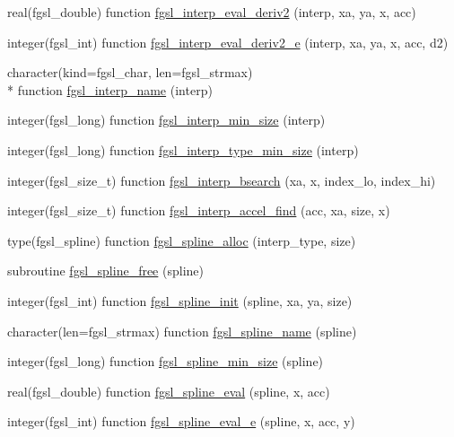 \begin{DoxyCompactItemize}
\item 
real(fgsl\-\_\-double) function \hyperlink{interp_8finc_a4b15b2342368a4046e9d18f60131a9e7}{fgsl\-\_\-interp\-\_\-eval\-\_\-deriv2} (interp, xa, ya, x, acc)
\item 
integer(fgsl\-\_\-int) function \hyperlink{interp_8finc_a5752fd272762ec6357b0f8c353c6c1a5}{fgsl\-\_\-interp\-\_\-eval\-\_\-deriv2\-\_\-e} (interp, xa, ya, x, acc, d2)
\item 
character(kind=fgsl\-\_\-char, len=fgsl\-\_\-strmax) \\*
function \hyperlink{interp_8finc_a13eac3e860747823e4eb7056cdbaaadb}{fgsl\-\_\-interp\-\_\-name} (interp)
\item 
integer(fgsl\-\_\-long) function \hyperlink{interp_8finc_a573225f56abbabd3f942f378933e3f32}{fgsl\-\_\-interp\-\_\-min\-\_\-size} (interp)
\item 
integer(fgsl\-\_\-long) function \hyperlink{interp_8finc_abecb0b2e997eb9e0f0c71cc9f49ad981}{fgsl\-\_\-interp\-\_\-type\-\_\-min\-\_\-size} (interp)
\item 
integer(fgsl\-\_\-size\-\_\-t) function \hyperlink{interp_8finc_a3dfb39ce96909da1ffe68251b6faec82}{fgsl\-\_\-interp\-\_\-bsearch} (xa, x, index\-\_\-lo, index\-\_\-hi)
\item 
integer(fgsl\-\_\-size\-\_\-t) function \hyperlink{interp_8finc_a056f54ec143fd153992cfa14ef3bd32f}{fgsl\-\_\-interp\-\_\-accel\-\_\-find} (acc, xa, size, x)
\item 
type(fgsl\-\_\-spline) function \hyperlink{interp_8finc_a5a2b4ca82d49d34aff7cf04a9a1b12ab}{fgsl\-\_\-spline\-\_\-alloc} (interp\-\_\-type, size)
\item 
subroutine \hyperlink{interp_8finc_a0f868da0ef3261a833026a41f2c94c83}{fgsl\-\_\-spline\-\_\-free} (spline)
\item 
integer(fgsl\-\_\-int) function \hyperlink{interp_8finc_a1f1a7747866bf3834763d7820d3df506}{fgsl\-\_\-spline\-\_\-init} (spline, xa, ya, size)
\item 
character(len=fgsl\-\_\-strmax) function \hyperlink{interp_8finc_a12c4a34e73aa03ba6dcdcdc6b270565d}{fgsl\-\_\-spline\-\_\-name} (spline)
\item 
integer(fgsl\-\_\-long) function \hyperlink{interp_8finc_a2a9de9f4376d87391948b2a36fd29f00}{fgsl\-\_\-spline\-\_\-min\-\_\-size} (spline)
\item 
real(fgsl\-\_\-double) function \hyperlink{interp_8finc_afd9bb964c160911f8fff6ada1478311e}{fgsl\-\_\-spline\-\_\-eval} (spline, x, acc)
\item 
integer(fgsl\-\_\-int) function \hyperlink{interp_8finc_aaa181d14fba2337815104a29864e8fef}{fgsl\-\_\-spline\-\_\-eval\-\_\-e} (spline, x, acc, y)

\end{DoxyCompactItemize}
